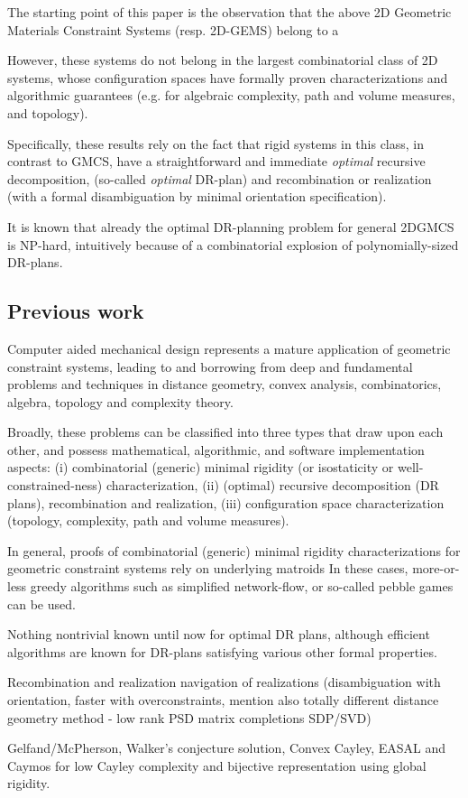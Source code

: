 The starting point of this paper is the observation that the above 2D Geometric Materials Constraint Systems (resp. 2D-GEMS) 
belong to a  

However, these systems do not 
belong in the largest combinatorial class of 2D systems, whose configuration spaces have formally proven  characterizations and 
algorithmic guarantees (e.g. for algebraic complexity, path and volume measures, and  topology).

Specifically, these results  rely on the fact that rigid systems in this  class, in contrast to GMCS, 
have a straightforward and immediate {\sl optimal} recursive decomposition, (so-called {\sl optimal} DR-plan) and  recombination 
or realization (with a formal disambiguation by minimal orientation specification).

It is known  that already the optimal DR-planning problem for general 2DGMCS is NP-hard, intuitively 
because of a combinatorial explosion of polynomially-sized DR-plans.  


\subsection{Previous work}

Computer aided mechanical design represents a mature application of geometric constraint systems,  leading to and borrowing 
from deep and fundamental problems and techniques in distance geometry, convex analysis, combinatorics, algebra, topology 
and complexity theory.

Broadly, these problems can be classified into three types that draw upon each other, and possess mathematical, algorithmic, 
and software implementation aspects: (i) combinatorial (generic) minimal rigidity (or isostaticity or well-constrained-ness) 
characterization, (ii) (optimal) recursive decomposition (DR plans), recombination and realization, (iii) configuration space 
characterization (topology, complexity, path and volume measures).

In general, proofs of combinatorial (generic) minimal rigidity characterizations for geometric constraint systems rely on 
underlying matroids  In these cases, more-or-less greedy algorithms such as simplified network-flow, 
or so-called pebble games can be used.

Nothing nontrivial known until now for optimal DR plans, although efficient algorithms are known for DR-plans satisfying 
various other formal properties.

Recombination and realization navigation of realizations (disambiguation with orientation, faster with overconstraints, mention 
also totally different distance geometry method - low rank PSD matrix completions SDP/SVD)

Gelfand/McPherson, Walker's conjecture solution, Convex Cayley, EASAL and Caymos for low Cayley complexity and bijective 
representation using global rigidity.

